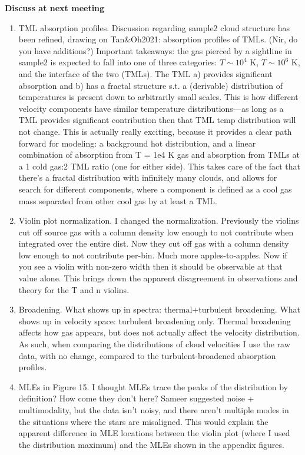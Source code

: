 \documentclass[fleqn,usenatbib]{mnras}
\begin{document}
\textbf{Discuss at next meeting}
\begin{enumerate}
    \item TML absorption profiles. Discussion regarding sample2 cloud structure has been refined, drawing on Tan\&Oh2021: absorption profiles of TMLs. (Nir, do you have additions?) Important takeaways: the gas pierced by a sightline in sample2 is expected to fall into one of three categories: $T \sim 10^4$ K, $T \sim 10^6$ K, and the interface of the two (TMLs). The TML a) provides significant absorption and b) has a fractal structure s.t. a (derivable) distribution of temperatures is present down to arbitrarily small scales. This is how different velocity components have similar temperature distributions---as long as a TML provides significant contribution then that TML temp distribution will not change. This is actually really exciting, because it provides a clear path forward for modeling: a background hot distribution, and a linear combination of absorption from T = 1e4 K gas and absorption from TMLs at a 1 cold gas:2 TML ratio (one for either side). This takes care of the fact that there's a fractal distribution with infinitely many clouds, and allows for search for different components, where a component is defined as a cool gas mass separated from other cool gas by at least a TML.
    \item Violin plot normalization. I changed the normalization. Previously the violins cut off source gas with a column density low enough to not contribute when integrated over the entire dist. Now they cut off gas with a column density low enough to not contribute per-bin. Much more apples-to-apples. Now if you see a violin with non-zero width then it should be observable at that value alone. This brings down the apparent disagreement in observations and theory for the T and n violins. 
    \item Broadening. What shows up in spectra: thermal+turbulent broadening. What shows up in velocity space: turbulent broadening only. Thermal broadening affects how gas appears, but does not actually affect the velocity distribution. As such, when comparing the distributions of cloud velocities I use the raw data, with no change, compared to the turbulent-broadened absorption profiles.
    \item MLEs in Figure 15. I thought MLEs trace the peaks of the distribution by definition? How come they don't here? Sameer suggested noise + multimodality, but the data isn't noisy, and there aren't multiple modes in the situations where the stars are misaligned. This would explain the apparent difference in MLE locations between the violin plot (where I used the distribution maximum) and the MLEs shown in the appendix figures.
\end{enumerate}
\end{document}
